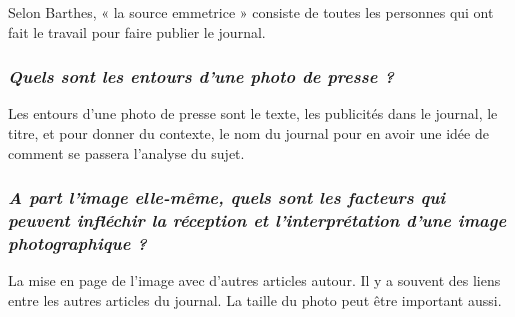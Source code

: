 \documentclass[12pt]{article}
\begin{document}
Selon Barthes, « la source emmetrice » consiste de toutes les personnes qui ont fait le travail pour faire publier le journal.

\subsubsection*{\textit{Quels sont les entours d'une photo de presse ?}}

Les entours d'une photo de presse sont le texte, les publicités dans le journal, le titre, et pour donner du contexte, le nom du journal pour en avoir une idée de comment se passera l'analyse du sujet.

\subsubsection*{\textit{A part l'image elle-même, quels sont les facteurs qui peuvent infléchir la réception et l'interprétation d'une image photographique ?}}

La mise en page de l'image avec d'autres articles autour. Il y a souvent des liens entre les autres articles du journal. La taille du photo peut être important aussi.
\end{document}
